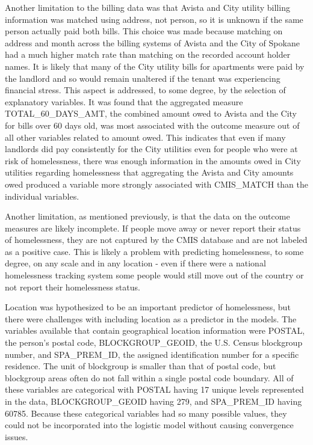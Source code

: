 \documentclass[12pt]{report}
\begin{document}
Another limitation to the billing data was that Avista and City utility billing information was matched using address, not person, so it is unknown if the same person actually paid both bills. This choice was made because matching on address and month across the billing systems of Avista and the City of Spokane had a much higher match rate than matching on the recorded account holder names. It is likely that many of the City utility bills for apartments were paid by the landlord and so would remain unaltered if the tenant was experiencing financial stress. This aspect is addressed, to some degree, by the selection of explanatory variables. It was found that the aggregated measure TOTAL\_60\_DAYS\_AMT, the combined amount owed to Avista and the City for bills over 60 days old, was most associated with the outcome measure out of all other variables related to amount owed. This indicates that even if many landlords did pay consistently for the City utilities even for people who were at risk of homelessness, there was enough information in the amounts owed in City utilities regarding homelessness that aggregating the Avista and City amounts owed produced a variable more strongly associated with CMIS\_MATCH than the individual variables.

Another limitation, as mentioned previously, is that the data on the outcome measures are likely incomplete. If people move away or never report their status of homelessness, they are not captured by the CMIS database and are not labeled as a positive case. This is likely a problem with predicting homelessness, to some degree, on any scale and in any location - even if there were a national homelessness tracking system some people would still move out of the country or not report their homelessness status.

Location was hypothesized to be an important predictor of homelessness, but there were challenges with including location as a predictor in the models. The variables available that contain geographical location information were POSTAL, the person's postal code, BLOCKGROUP\_GEOID, the U.S. Census blockgroup number, and SPA\_PREM\_ID, the assigned identification number for a specific residence. The unit of blockgroup is smaller than that of postal code, but blockgroup areas often do not fall within a single postal code boundary. All of these variables are categorical with POSTAL having 17 unique levels represented in the data, BLOCKGROUP\_GEOID having 279, and SPA\_PREM\_ID having 60785. Because these categorical variables had so many possible values, they could not be incorporated into the logistic model without causing convergence issues.



\end{document}
